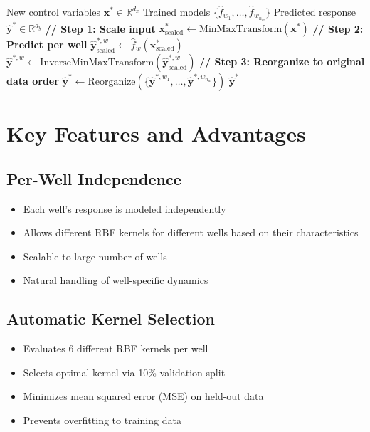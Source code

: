 \documentclass[11pt]{article}
\begin{document}
\begin{algorithm}
\caption{ProxyModelRBF Prediction}
\begin{algorithmic}[1]
\Require New control variables $\mathbf{x}^* \in \mathbb{R}^{d_x}$
\Require Trained models $\{\hat{f}_{w_1}, \ldots, \hat{f}_{w_{n_w}}\}$
\Ensure Predicted response $\hat{\mathbf{y}}^* \in \mathbb{R}^{d_y}$
\State
\State \textbf{// Step 1: Scale input}
\State $\mathbf{x}^*_{\text{scaled}} \gets \text{MinMaxTransform}(\mathbf{x}^*)$
\State
\State \textbf{// Step 2: Predict per well}
    \State $\hat{\mathbf{y}}^{*,w}_{\text{scaled}} \gets \hat{f}_w(\mathbf{x}^*_{\text{scaled}})$
    \State $\hat{\mathbf{y}}^{*,w} \gets \text{InverseMinMaxTransform}(\hat{\mathbf{y}}^{*,w}_{\text{scaled}})$
\EndFor
\State
\State \textbf{// Step 3: Reorganize to original data order}
\State $\hat{\mathbf{y}}^* \gets \text{Reorganize}(\{\hat{\mathbf{y}}^{*,w_1}, \ldots, \hat{\mathbf{y}}^{*,w_{n_w}}\})$
\State \Return $\hat{\mathbf{y}}^*$
\end{algorithmic}
\end{algorithm}

\section{Key Features and Advantages}

\subsection{Per-Well Independence}
\begin{itemize}
    \item Each well's response is modeled independently
    \item Allows different RBF kernels for different wells based on their characteristics
    \item Scalable to large number of wells
    \item Natural handling of well-specific dynamics
\end{itemize}

\subsection{Automatic Kernel Selection}
\begin{itemize}
    \item Evaluates 6 different RBF kernels per well
    \item Selects optimal kernel via 10\% validation split
    \item Minimizes mean squared error (MSE) on held-out data
    \item Prevents overfitting to training data
\end{itemize}
\end{document}
